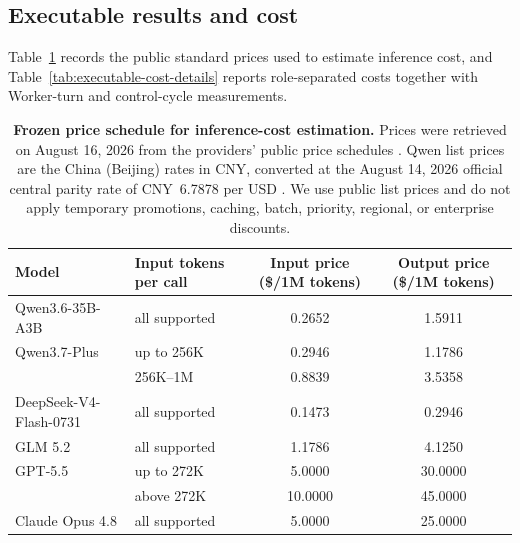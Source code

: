 \subsection{Executable results and cost}
\label{app:cost-accounting}

Table~\ref{tab:price-schedule} records the public standard prices used to estimate inference cost, and Table~\ref{tab:executable-cost-details} reports role-separated costs together with Worker-turn and control-cycle measurements.

\begin{table}[H]
\caption{\textbf{Frozen price schedule for inference-cost estimation.} Prices were retrieved on August 16, 2026 from the providers' public price schedules \citep{AlibabaModelStudioPricing2026,OpenAIGPT55Pricing2026,AnthropicAPIPricing2026}. Qwen list prices are the China (Beijing) rates in CNY, converted at the August 14, 2026 official central parity rate of CNY~6.7878 per USD \citep{SAFEExchangeRate2026}. We use public list prices and do not apply temporary promotions, caching, batch, priority, regional, or enterprise discounts.}
\label{tab:price-schedule}
\centering
\small
\setlength{\tabcolsep}{4pt}
\begin{tabular}{@{}llcc@{}}
\toprule
Model & Input tokens per call & \shortstack{Input price\\(\$/1M tokens)} & \shortstack{Output price\\(\$/1M tokens)} \\
\midrule
Qwen3.6-35B-A3B & all supported & 0.2652 & 1.5911 \\
Qwen3.7-Plus & up to 256K & 0.2946 & 1.1786 \\
 & 256K--1M & 0.8839 & 3.5358 \\
DeepSeek-V4-Flash-0731 & all supported & 0.1473 & 0.2946 \\
GLM 5.2 & all supported & 1.1786 & 4.1250 \\
GPT-5.5 & up to 272K & 5.0000 & 30.0000 \\
 & above 272K & 10.0000 & 45.0000 \\
Claude Opus 4.8 & all supported & 5.0000 & 25.0000 \\
\bottomrule
\end{tabular}
\end{table}

